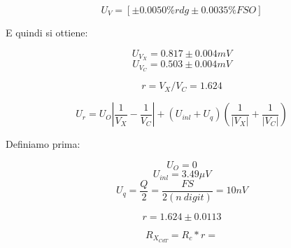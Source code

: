 \documentclass[a4paper]{article}
\begin{document}
\begin{Large} 
	\begin{equation}
		U_{V} = [\pm 0.0050\%rdg \pm 0.0035\% FSO]
	 \end{equation}
\end{Large}
E quindi si ottiene:
\begin{Large} 
	\begin{equation}
		U_{V_X} = 0.817 \pm 0.004 mV
	 \end{equation}
	 \begin{equation}
		U_{V_C} = 0.503 \pm 0.004 mV
	 \end{equation}
\end{Large}
\begin{Large}
	\begin{equation}
		r = {V_X}/{V_C}= 1.624
	 \end{equation}
\end{Large}
\begin{Large} 
	 \begin{equation}
		U_{r} = U_{O}|\frac{1}{V_X}-\frac{1}{V_C}|+(U_{inl}+U_q)(\frac{1}{|V_X|}+\frac{1}{|V_C|})
	 \end{equation}
\end{Large}
Definiamo prima:
\begin{Large}
	\begin{equation}
		U_O= 0
	 \end{equation}
	 \begin{equation}
		U_{inl} = 3.49 \mu V
	 \end{equation}
	 \begin{equation}
		U_{q} = \frac{Q}{2}= \frac{FS}{2(n\ digit)}=10nV
	 \end{equation}
\end{Large}
\begin{Large} 
	\begin{equation}
		r = 1.624 \pm 0.0113
	 \end{equation}
\end{Large}
\begin{Large} 
	\begin{equation}
		R_{X_{CdT}} = R_c* r = 
	 \end{equation}
\end{Large}
\end{document}
